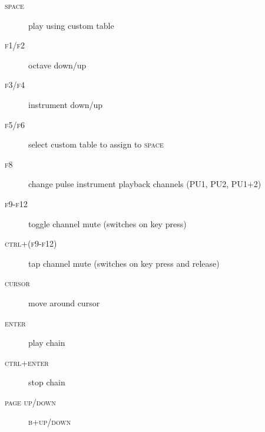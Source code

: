 \begin{description}
\item[\textsc{space}] play using custom table
\item[\textsc{f1/f2}] octave down/up
\item[\textsc{f3/f4}] instrument down/up
\item[\textsc{f5/f6}] select custom table to assign to \textsc{space}
\item[\textsc{f8}] change pulse instrument playback channels (\textsc{PU1, PU2, PU1+2})
\item[\textsc{f9-f12}] toggle channel mute (switches on key press)
\item[\textsc{ctrl+(f9-f12)}] tap channel mute (switches on key press and release)
\item[\textsc{cursor}] move around cursor
\item[\textsc{enter}] play chain
\item[\textsc{ctrl+enter}] stop chain
\item[\textsc{page up/down}] \textsc{b+up/down}
\end{description}

